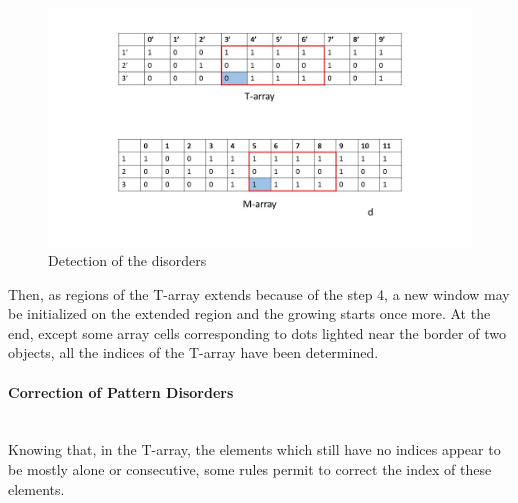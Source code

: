 \begin{figure}[h]
\begin{minipage}[b]{0.50\linewidth}
   \end{minipage}\hfill
   \begin{minipage}[b]{0.50\linewidth}   
      \centering \includegraphics[scale=0.3]{fig/detect4.jpg}
   \end{minipage}
	\caption{Detection of the disorders}
	\label{fig:detect}
\end{figure}


Then, as regions of the T-array extends because of the step 4, a new window may be initialized on the extended region and the growing starts once more. At the end, except some array cells corresponding to dots lighted near the border of two objects, all the indices of the T-array have been determined.










\paragraph*{Correction of Pattern Disorders}
~~\\
Knowing that, in the T-array, the elements which still have no indices appear to be mostly alone or consecutive, some rules permit to correct the index of these elements.

